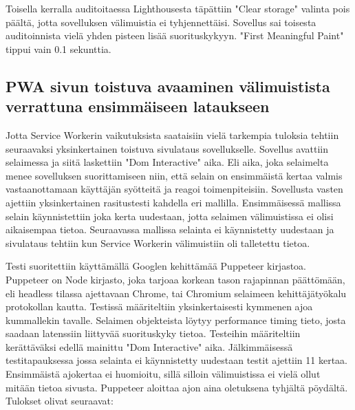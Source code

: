 \documentclass{tktltiki}
\begin{document}
Toisella kerralla auditoitaessa Lighthousesta täpättiin "Clear storage" valinta pois päältä, jotta sovelluksen välimuistia ei tyhjennettäisi. Sovellus sai toisesta auditoinnista vielä yhden pisteen lisää suorituskykyyn. "First Meaningful Paint" tippui vain 0.1 sekunttia.

\subsection{PWA sivun toistuva avaaminen välimuistista verrattuna ensimmäiseen lataukseen}

Jotta Service Workerin vaikutuksista saataisiin vielä tarkempia tuloksia tehtiin seuraavaksi yksinkertainen toistuva sivulataus sovellukselle. Sovellus avattiin selaimessa ja siitä laskettiin "Dom Interactive" aika. Eli aika, joka selaimelta menee sovelluksen suorittamiseen niin, että selain on ensimmäistä kertaa valmis vastaanottamaan käyttäjän syötteitä ja reagoi toimenpiteisiin. Sovellusta vasten ajettiin yksinkertainen rasitustesti kahdella eri mallilla. Ensimmäisessä mallissa selain käynnistettiin joka kerta uudestaan, jotta selaimen välimuistissa ei olisi aikaisempaa tietoa. Seuraavassa mallissa selainta ei käynnistetty uudestaan ja sivulataus tehtiin kun Service Workerin välimuistiin oli talletettu tietoa. 

Testi suoritettiin käyttämällä Googlen kehittämää Puppeteer kirjastoa. \cite{Google3} Puppeteer on Node kirjasto, joka tarjoaa korkean tason rajapinnan päättömään, eli headless tilassa ajettavaan Chrome, tai Chromium selaimeen kehittäjätyökalu protokollan kautta. Testissä määriteltiin yksinkertaisesti kymmenen ajoa kummallekin tavalle. Selaimen objekteista löytyy performance timing tieto, josta saadaan latenssiin liittyvää suorituskyky tietoa. Testeihin määriteltiin kerättäväksi edellä mainittu "Dom Interactive" aika. Jälkimmäisessä testitapauksessa jossa selainta ei käynnistetty uudestaan testit ajettiin 11 kertaa. Ensimmäistä ajokertaa ei huomioitu, sillä silloin välimuistissa ei vielä ollut mitään tietoa sivusta. Puppeteer aloittaa ajon aina oletuksena tyhjältä pöydältä. Tulokset olivat seuraavat:
\end{document}
